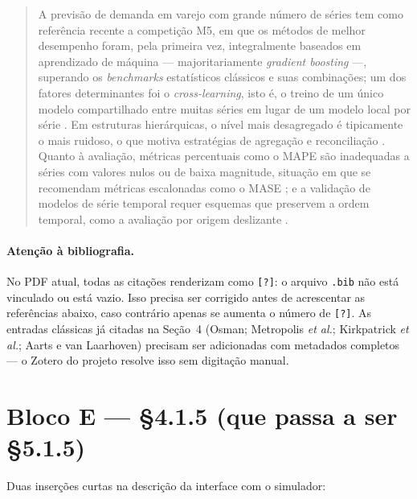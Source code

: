 \documentclass[11pt]{article}
\begin{document}
\begin{quote}
A previsão de demanda em varejo com grande número de séries tem como
referência recente a competição M5, em que os métodos de melhor
desempenho foram, pela primeira vez, integralmente baseados em
aprendizado de máquina --- majoritariamente \emph{gradient boosting} ---,
superando os \emph{benchmarks} estatísticos clássicos e suas combinações;
um dos fatores determinantes foi o \emph{cross-learning}, isto é, o treino
de um único modelo compartilhado entre muitas séries em lugar de um modelo
local por série \cite{makridakis2022m5}. Em estruturas hierárquicas, o
nível mais desagregado é tipicamente o mais ruidoso, o que motiva
estratégias de agregação e reconciliação \cite{fpp3hierarchical}. Quanto à
avaliação, métricas percentuais como o MAPE são inadequadas a séries com
valores nulos ou de baixa magnitude, situação em que se recomendam
métricas escalonadas como o MASE \cite{hyndmanforesight}; e a validação de
modelos de série temporal requer esquemas que preservem a ordem temporal,
como a avaliação por origem deslizante \cite{fpp3cv}.
\end{quote}

\paragraph{Atenção à bibliografia.} No PDF atual, todas as citações
renderizam como \texttt{[?]}: o arquivo \texttt{.bib} não está vinculado
ou está vazio. Isso precisa ser corrigido antes de acrescentar as
referências abaixo, caso contrário apenas se aumenta o número de
\texttt{[?]}. As entradas clássicas já citadas na Seção~4 (Osman;
Metropolis \emph{et al.}; Kirkpatrick \emph{et al.}; Aarts e van
Laarhoven) precisam ser adicionadas com metadados completos --- o Zotero
do projeto resolve isso sem digitação manual.

\section*{Bloco E — §4.1.5 (que passa a ser §5.1.5)}

Duas inserções curtas na descrição da interface com o simulador:
\end{document}
